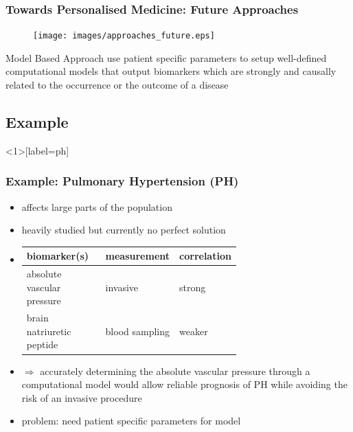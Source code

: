 \documentclass[compress]{beamer}
\begin{document}
\begin{frame}
	\frametitle{Towards Personalised Medicine: Future Approaches}
	\begin{minipage}{0.59\textwidth}
		\begin{figure}[H]
			\texttt{[image: images/approaches\_future.eps]}
		\end{figure}
	\end{minipage} \hfill
	\begin{minipage}{0.39\textwidth}
		\begin{minipage}[t][0.56\paperheight][t]{\textwidth}
			\begin{block}{Model Based Approach}
				use patient specific parameters to setup well-defined computational models that output biomarkers which are strongly and causally related to the occurrence or the outcome of a disease
			\end{block}
		\end{minipage}
		\begin{minipage}[t][0.26\paperheight][t]{\textwidth}
		\end{minipage}
	\end{minipage}
\end{frame}
\subsection{Example}
\begin{frame}<1>[label=ph]
	\frametitle{Example: Pulmonary Hypertension (PH)}
	\begin{itemize}
		\item<1-> affects large parts of the population
		\item<2-> heavily studied but currently no perfect solution 
		\item<3-> \begin{tabularx}{\linewidth}{| >{\centering\arraybackslash}m{0.4\linewidth} | >{\centering\arraybackslash}m{0.25\linewidth} | >{\centering\arraybackslash}X |} 
				\hline
				biomarker(s) & measurement & correlation \\ 
				\hline
				\hline
				absolute vascular pressure & invasive & strong \\ 
				\hline
				brain natriuretic peptide & blood sampling & weaker \\ 
				\hline
			\end{tabularx}
		\item<4->
			$\Rightarrow$ accurately determining the absolute vascular pressure through a computational model would allow reliable prognosis of PH while avoiding the risk of an invasive procedure
		\item<5-> problem: need patient specific parameters for model
	\end{itemize}
\end{frame}
\end{document}
